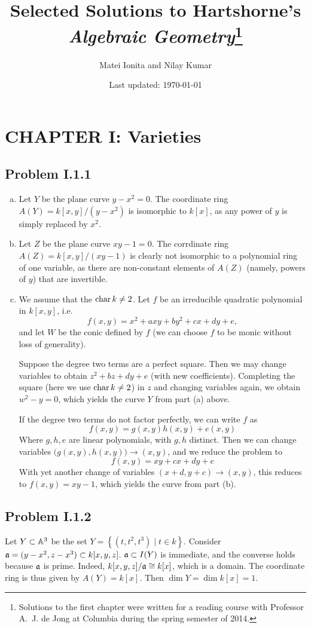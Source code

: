 \documentclass{mathnotes}
\title{Selected Solutions to Hartshorne's \textit{Algebraic Geometry}\footnote{Solutions to the first chapter were written for a reading course with Professor A.~J. de Jong at Columbia during the spring semester of 2014.}}
\author{Matei Ionita and Nilay Kumar}
\date{Last updated: \today}
\begin{document}
\maketitle

\section*{CHAPTER I: Varieties}

\subsection*{Problem I.1.1}
\begin{enumerate}[(a)]
    \item Let $Y$ be the plane curve $y-x^2=0$. The coordinate ring $A(Y)=k[x,y]/(y-x^2)$
        is isomorphic to $k[x]$, as any power of $y$ is simply replaced by $x^2$.
    \item Let $Z$ be the plane curve $xy-1=0$. The corrdinate ring $A(Z)=k[x,y]/(xy-1)$
        is clearly not isomorphic to a polynomial ring of one variable, as there are
        non-constant elements of $A(Z)$ (namely, powers of $y$) that are invertible.
    \item We assume that the $\operatorname{char} k\neq 2$.
        Let $f$ be an irreducible quadratic polynomial in $k[x,y]$, i.e.
        \[f(x,y)=x^2+axy+by^2+cx+dy+e,\]
        and let $W$ be the conic defined by $f$ (we can choose $f$ to be monic without
        loss of generality).
        
        Suppose the degree two terms are a perfect square.
        Then we may change variables to obtain $z^2+bz+dy+e$ (with new coefficients).
        Completing the square (here we use $\operatorname{char} k\neq 2$) in $z$ and changing
        variables again, we obtain $w^2-y=0$, which yields the curve $Y$ from part
        (a) above.

        If the degree two terms do not factor perfectly, we can write $f$ as
\[       f(x,y) = g(x,y) h(x,y) + e(x,y)     \]
Where $g,h,e$ are linear polynomials, with $g,h$ distinct. Then we can change variables $\big( g(x,y) , h(x,y) \big) \to (x,y)  $, and we reduce the problem to
\[       f(x,y) = xy + cx + dy +e      \]
With yet another change of variables $(x+d, y+c) \to (x,y)$, this reduces to $f(x,y) = xy - 1$, which yields the curve from part (b).
\end{enumerate}

\subsection*{Problem I.1.2}
Let $Y\subset \mathbb{A}^3$ be the set $Y=\left\{ (t,t^2,t^3)\mid t\in k\right\}$.
Consider $\mathfrak a=(y-x^2,z-x^3)\subset k[x,y,z]$. $\mathfrak a \subset I(Y)$ is immediate, and the converse holds because $\mathfrak a$ is prime. Indeed, $k[x,y,z]/\mathfrak a \cong k[x]$, which is a domain. The coordinate ring is thus given by $A(Y)=k[x]$. Then $\dim Y = \dim k[x] = 1$.
\end{document}
